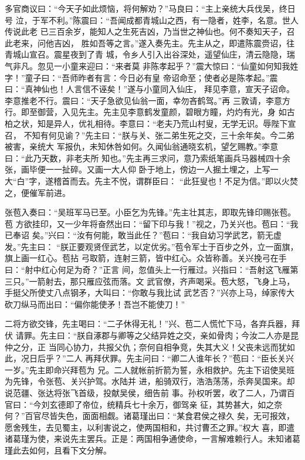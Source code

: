 多官商议曰：“今天子如此烦恼，将何解劝？”马良曰：“主上亲统大兵伐吴，终日号
泣，于军不利。”陈震曰：“吾闻成都青城山之西，有一隐者，姓李，名意。世人传说此老
已三百余岁，能知人之生死吉凶，乃当世之神仙也。何不奏知天子，召此老来，问他吉凶，
胜如吾等之言。”遂入奏先主。先主从之，即遣陈震赍诏，往青城山宣召。震星夜到了青
城，令乡人引入出谷深处，遥望仙庄，清云隐隐，瑞气非凡。忽见一小童来迎曰：“来者莫
非陈孝起乎？”震大惊曰：“仙童如何知我姓字！”童子曰：“吾师昨者有言：今日必有皇
帝诏命至；使者必是陈孝起。”震曰：“真神仙也！人言信不诬矣！”遂与小童同入仙庄，
拜见李意，宣天子诏命。李意推老不行。震曰：“天子急欲见仙翁一面，幸勿吝鹤驾。”再
三敦请，李意方行。即至御营，入见先主。先主见李意鹤发童颜，碧眼方瞳，灼灼有光，身
如古柏之状，知是异人，优礼相待。李意曰：“老夫乃荒山村叟，无学无识。辱陛下宣召，
不知有何见谕？”先主曰：“朕与关、张二弟生死之交，三十余年矣。今二弟被害，亲统大
军报仇，未知休咎如何。久闻仙翁通晓玄机，望乞赐教。”李意曰：“此乃天数，非老夫所
知也。”先主再三求问，意乃索纸笔画兵马器械四十余张，画毕便一一扯碎。又画一大人仰
卧于地上，傍边一人掘土埋之，上写一大“白”字，遂稽首而去。先主不悦，谓群臣曰：
“此狂叟也！不足为信。”即以火焚之，便催军前进。

张苞入奏曰：“吴班军马已至。小臣乞为先锋。”先主壮其志，即取先锋印赐张苞。苞
方欲挂印，又一少年将奋然出曰：“留下印与我！”视之，乃关兴也。苞曰：“我已奉诏
矣。”兴曰：“汝有何能，敢当此任？”苞曰：“我自幼习学武艺，箭无虚发。”先主曰：
“朕正要观贤侄武艺，以定优劣。”苞令军士于百步之外，立一面旗，旗上画一红心。苞拈
弓取箭，连射三箭，皆中红心。众皆称善。关兴挽弓在手曰：“射中红心何足为奇？”正言
间，忽值头上一行雁过。兴指曰：“吾射这飞雁第三只。”一箭射去，那只雁应弦而落。文
武官僚，齐声喝采。苞大怒，飞身上马，手挺父所使丈八点钢矛，大叫曰：“你敢与我比试
武艺否？”兴亦上马，绰家传大砍刀纵马而出曰：“偏你能使矛！吾岂不能使刀！”

二将方欲交锋，先主喝曰：“二子休得无礼！”兴、苞二人慌忙下马，各弃兵器，拜伏
请罪。先主曰：“朕自涿郡与卿等之父结异姓之交，亲如骨肉；今汝二人亦是昆仲之分，正
当同心协力，共报父仇；奈何自相争竞，失其大义！父丧未远而犹如此，况日后乎？”二人
再拜伏罪。先主问曰：“卿二人谁年长？”苞曰：“臣长关兴一岁。”先主即命兴拜苞为
兄。二人就帐前折箭为誓，永相救护。先主下诏使吴班为先锋，令张苞、关兴护驾。水陆并
进，船骑双行，浩浩荡荡，杀奔吴国来。却说范疆、张达将张飞首级，投献吴侯，细告前
事。孙权听罢，收了二人，乃谓百官曰：“今刘玄德即了帝位，统精兵七十余万，御驾亲
征，其势甚大，如之奈何？”百官尽皆失色，面面相觑。诸葛瑾出曰：“某食君侯之禄久
矣，无可报效，愿舍残生，去见蜀主，以利害说之，使两国相和，共讨曹丕之罪。”权大
喜，即遣诸葛瑾为使，来说先主罢兵。正是：两国相争通使命，一言解难赖行人。未知诸葛
瑾此去如何，且看下文分解。